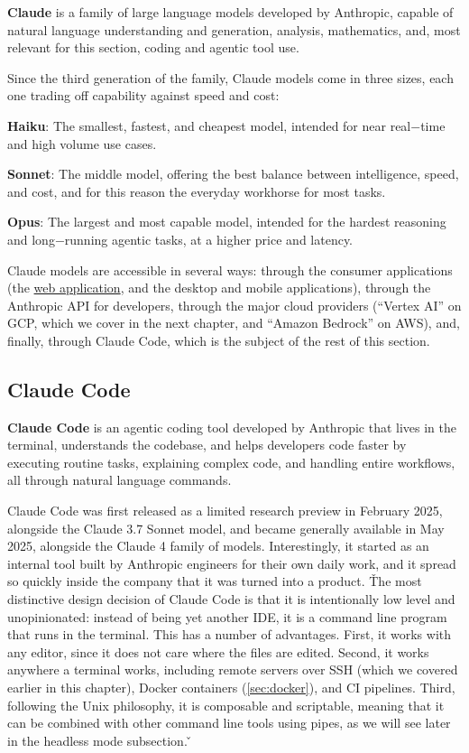 \bd[Claude]
\textbf{Claude} is a family of large language models developed by Anthropic, capable of natural language
understanding and generation, analysis, mathematics, and, most relevant for this section, coding and agentic tool use.
\ed

Since the third generation of the family, Claude models come in three sizes, each one trading off capability against
speed and cost:
\bit
\item \textbf{Haiku}: The smallest, fastest, and cheapest model, intended for near real$-$time and high volume use
cases.
\item \textbf{Sonnet}: The middle model, offering the best balance between intelligence, speed, and cost, and for this
reason the everyday workhorse for most tasks.
\item \textbf{Opus}: The largest and most capable model, intended for the hardest reasoning and long$-$running agentic
tasks, at a higher price and latency.
\eit

Claude models are accessible in several ways: through the consumer applications (the \href{https://claude.ai}{web
application}, and the desktop and mobile applications), through the Anthropic API for developers, through the major
cloud providers (``Vertex AI'' on GCP, which we cover in the next chapter, and ``Amazon Bedrock'' on AWS), and,
finally, through Claude Code, which is the subject of the rest of this section.

\subsection{Claude Code}

\textbf{Claude Code} is an agentic coding tool developed by Anthropic that lives in the terminal, understands the
codebase, and helps developers code faster by executing routine tasks, explaining complex code, and handling entire
workflows, all through natural language commands.
\ed

Claude Code was first released as a limited research preview in February 2025, alongside the Claude 3.7 Sonnet model,
and became generally available in May 2025, alongside the Claude 4 family of models. Interestingly, it started as an
internal tool built by Anthropic engineers for their own daily work, and it spread so quickly inside the company that
it was turned into a product. \v

The most distinctive design decision of Claude Code is that it is intentionally low level and unopinionated: instead
of being yet another IDE, it is a command line program that runs in the terminal. This has a number of advantages.
First, it works with any editor, since it does not care where the files are edited. Second, it works anywhere a
terminal works, including remote servers over SSH (which we covered earlier in this chapter), Docker containers
(\ref{sec:docker}), and CI pipelines. Third, following the Unix philosophy, it is
composable and scriptable, meaning that it can be combined with other command line tools using pipes, as we will see
later in the headless mode subsection. \v

